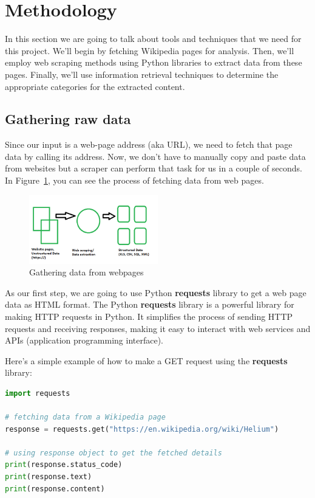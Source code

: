 \documentclass{article}
\begin{document}
\section{Methodology}
In this section we are going to talk about tools and techniques that we need for this project.
We'll begin by fetching Wikipedia pages for analysis.
Then, we'll employ web scraping methods using Python libraries to extract data from these pages.
Finally, we'll use information retrieval techniques to determine the appropriate categories for the extracted content.

\subsection{Gathering raw data}
Since our input is a web-page address (aka URL), we need to fetch that page data by calling its address.
Now, we don't have to manually copy and paste data from websites but a scraper can perform that task for us in a couple of seconds.
In Figure~\ref{fig:webpages}, you can see the process of fetching data from web pages.

\begin{figure}[h]
    \centering
    \includegraphics[width=0.5\textwidth]{./pics/web.png}
    \caption{Gathering data from webpages}
    \label{fig:webpages}
\end{figure}

As our first step, we are going to use Python \textbf{requests} library to get a web page data as HTML format.
The Python \textbf{requests}  library is a powerful library for making HTTP requests in Python.
It simplifies the process of sending HTTP requests and receiving responses, making it easy to interact with web services and APIs (application programming interface).

Here's a simple example of how to make a GET request using the \textbf{requests} library:

\begin{lstlisting}[language=Python, caption=Example of getting a page content]
import requests

# fetching data from a Wikipedia page
response = requests.get("https://en.wikipedia.org/wiki/Helium")

# using response object to get the fetched details
print(response.status_code)
print(response.text)
print(response.content)
\end{lstlisting}
\end{document}

